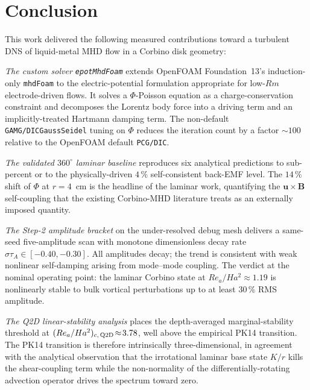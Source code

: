 \documentclass[aps,prl,twocolumn,superscriptaddress]{revtex4-2}
\begin{document}
\section{Conclusion}

This work delivered the following measured contributions toward a
turbulent DNS of liquid-metal MHD flow in a Corbino disk geometry:

\textit{The custom solver \texttt{epotMhdFoam}} extends OpenFOAM
Foundation~13's induction-only \texttt{mhdFoam} to the
electric-potential formulation appropriate for low-$Rm$
electrode-driven flows.  It solves a $\Phi$-Poisson equation as a
charge-conservation constraint and decomposes the Lorentz body force
into a driving term and an implicitly-treated Hartmann damping term.
The non-default \texttt{GAMG/DICGaussSeidel} tuning on $\Phi$ reduces
the iteration count by a factor $\sim\!100$ relative to the OpenFOAM
default \texttt{PCG/DIC}.

\textit{The validated $360^{\circ}$ laminar baseline} reproduces six
analytical predictions to sub-percent or to the physically-driven
$4\,\%$ self-consistent back-EMF level.  The $14\,\%$ shift of $\Phi$
at $r = 4$~cm is the headline of the laminar work, quantifying the
$\mathbf{u}\!\times\!\mathbf{B}$ self-coupling that the existing
Corbino-MHD literature treats as an externally imposed quantity.

\textit{The Step-2 amplitude bracket} on the under-resolved debug
mesh delivers a same-seed five-amplitude scan with monotone
dimensionless decay rate $\sigma\tau_A\in[-0.40,-0.30]$.  All
amplitudes decay; the trend is consistent with weak nonlinear
self-damping arising from mode--mode coupling.  The verdict at the
nominal operating point: the laminar Corbino state at
$Re_a/Ha^{2}\!\approx\!1.19$ is nonlinearly stable to bulk vortical
perturbations up to at least $30\,\%$ RMS amplitude.

\textit{The Q2D linear-stability analysis} places the depth-averaged
marginal-stability threshold at
$(Re_a/Ha^{2})_{c,\,\rm Q2D}\!\approx\!3.78$, well above the
empirical PK14 transition.  The PK14 transition is therefore
intrinsically three-dimensional, in agreement with the analytical
observation that the irrotational laminar base state $K/r$ kills the
shear-coupling term while the non-normality of the
differentially-rotating advection operator drives the spectrum
toward zero.
\end{document}
